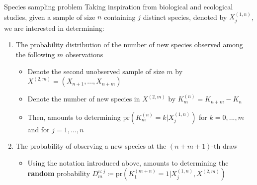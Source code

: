 \documentclass[11pt, handout]{beamer}
\newcommand\Fontvi{\fontsize{10}{12}\selectfont}
\newcommand{\circled}[1]{%
  \scalebox{0.6}{\tikz\node%
    [outer sep=0pt, inner sep=2pt,
      line width=0pt,text=white,fill=blue!50,draw,circle,shading=ball]{#1};%
  }%
}
\newcommand{\bref}[1]{\circled{\ref{#1}}}
\begin{document}
\begin{frame}{Species sampling problem}
    \Fontvi{}
    Taking inspiration from biological and ecological studies, given a sample of size \(n\) containing \(j\) distinct species, denoted by \(X_j^{(1,n)}\), we are interested in determining:
    \begin{enumerate}
        \item\label{item:one} The probability distribution of the number of new species observed among the following \(m\) observations
        \begin{itemize}
            \item Denote the second unobserved sample of size \(m\) by \(X^{(2, m)} = (X_{n+1},...,X_{n+m})\)
            \item Denote the number of new species in \(X^{(2, m)}\) by \(K_m^{(n)} = K_{n + m} - K_n\)
            \item Then, \bref{item:one} amounts to determining \(\text{pr}(K_m^{(n)} = k | X_j^{(1,n)})\) for \(k = 0,...,m\) and for \(j = 1,...,n\) %
        \end{itemize}
        \item\label{item:two} The probability of observing a new species at the \((n + m + 1)\)-th draw
        \begin{itemize}
            \item Using the notation introduced above, \bref{item:two} amounts to determining the \textbf{random} probability \(D_m^{n:j} \coloneqq \text{pr}(K_1^{(m + n)} = 1 | X_j^{(1,n)}, X^{(2, m)})\) %
        \end{itemize}
    \end{enumerate}
\end{frame}
\end{document}
